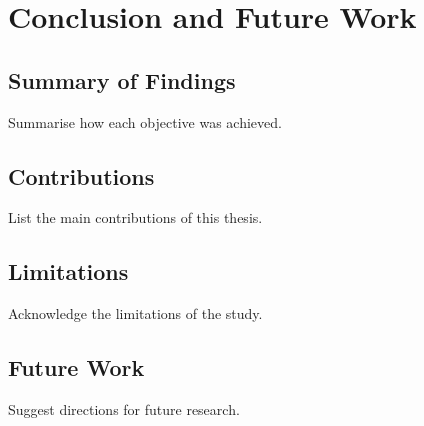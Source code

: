 \chapter{Conclusion and Future Work}
\label{chap:conclusion}

\section{Summary of Findings}
Summarise how each objective was achieved.

\section{Contributions}
List the main contributions of this thesis.

\section{Limitations}
Acknowledge the limitations of the study.

\section{Future Work}
Suggest directions for future research.
